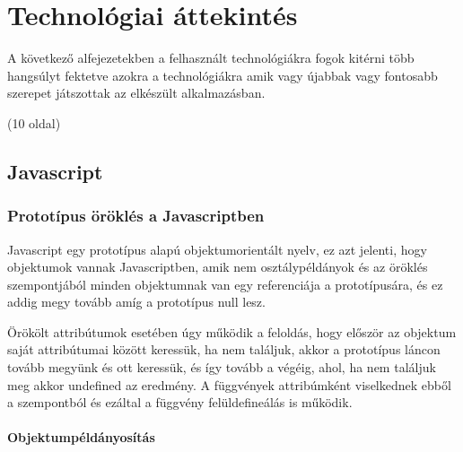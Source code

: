 



\chapter{Technológiai áttekintés}
A következő alfejezetekben a felhasznált technológiákra fogok kitérni több hangsúlyt fektetve azokra a technológiákra amik vagy újabbak vagy fontosabb szerepet játszottak az elkészült alkalmazásban.

(10 oldal)

\section{Javascript}

\subsection{Prototípus öröklés a Javascriptben}


Javascript egy prototípus alapú objektumorientált nyelv, ez azt jelenti, hogy objektumok vannak Javascriptben, amik nem osztálypéldányok és az öröklés szempontjából minden objektumnak van egy referenciája a prototípusára, és ez addig megy tovább amíg a prototípus null lesz. 

Örökölt attribútumok esetében úgy működik a feloldás, hogy először az objektum saját attribútumai között keressük, ha nem találjuk, akkor a prototípus láncon tovább megyünk és ott keressük, és így tovább a végéig, ahol, ha nem találjuk meg akkor undefined az eredmény. A függvények attribúmként viselkednek ebből a szempontból és ezáltal a függvény felüldefineálás is működik.

\subsubsection{Objektumpéldányosítás}

